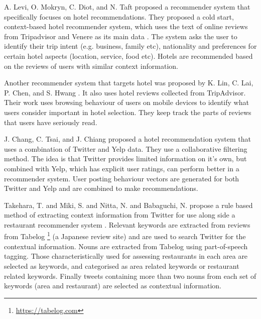 A. Levi, O. Mokryn, C. Diot, and N. Taft proposed a recommender system that specifically focuses on hotel recommendations. They proposed a cold start, context-based hotel recommender system, which uses the text of online reviews from Tripadvisor and Venere as its main data \cite{levi2012}. The system asks the user to identify their trip intent (e.g. business, family etc), nationality and preferences for certain hotel aspects (location, service, food etc). Hotels are recommended based on the reviews of users with similar context information.

Another recommender system that targets hotel was proposed by K. Lin, C. Lai, P. Chen, and S. Hwang \cite{lin2015}. It also uses hotel reviews collected from TripAdvisor. Their work uses browsing behaviour of users on mobile devices to identify what users consider important in hotel selection. They keep track the parts of reviews that users have seriously read.

J. Chang, C. Tsai, and J. Chiang \cite{chang2018} proposed a hotel recommendation system that uses a combination of Twitter and Yelp data. They use a collaborative filtering method. The idea is that Twitter provides limited information on it's own, but combined with Yelp, which has explicit user ratings, can perform better in a recommender system. User posting behaviour vectors are generated for both Twitter and Yelp and are combined to make recommendations.

Takehara, T. and Miki, S. and Nitta, N. and Babaguchi, N. propose a rule based method of extracting context information from Twitter for use along side a restaurant recommender system \cite{takeharaContext2012}. Relevant keywords are extracted from reviews from Tabelog \footnote{\url{https://tabelog.com}} (a Japanese review site) and are used to search Twitter for the contextual information. Nouns are extracted from Tabelog using part-of-speech tagging. Those characteristically used for assessing restaurants in each area are selected as keywords, and categorised as area related keywords or restaurant related keywords. Finally tweets containing more than two nouns from each set of keywords (area and restaurant) are selected as contextual information.
